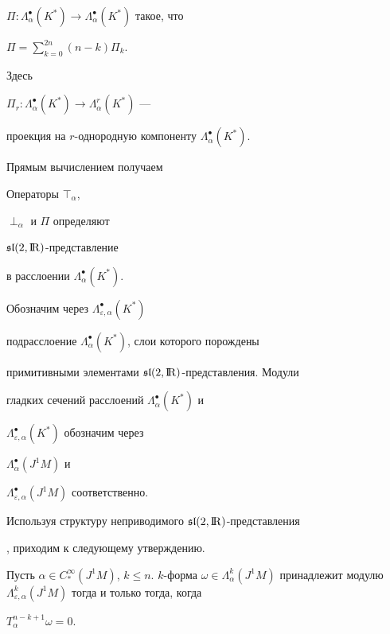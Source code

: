 $\Pi :\Lambda_\alpha^{\bullet }(K^{*})\to \Lambda_\alpha^{\bullet


}(K^{*})$ такое, что 


$\Pi =\sum\limits_{k=0}^{2n}(n-k)\Pi_k$.


Здесь 


$\Pi_r:\Lambda_\alpha^{\bullet }(K^{*})\to \Lambda_\alpha^r(K^{*})$ ---


проекция на $r$-однородную компоненту $\Lambda_\alpha^{\bullet }(K^{*})$.





Прямым вычислением получаем  





\begin{prop}


Операторы $\top_\alpha $,


$\perp_\alpha $ и $\Pi $ определяют


${\frak s\frak l}(2,{\mathrm{I\!R}})$-представление


в расслоении $\Lambda_\alpha^{\bullet }(K^{*})$.


\end{prop}





Обозначим через $\Lambda_{\varepsilon ,\alpha }^{\bullet }(K^{*})$ 


подрасслоение $\Lambda_\alpha^{\bullet }(K^{*})$, слои которого порождены


примитивными элементами ${\frak s\frak l}(2,{\mathrm{I\!R}})$-представления. Модули


гладких сечений расслоений $\Lambda_\alpha^{\bullet }(K^{*})$ и


$\Lambda_{\varepsilon ,\alpha }^{\bullet }(K^{*})$ обозначим через


$\Lambda_{\alpha }^{\bullet }(J^1M)$ и


$\Lambda_{\varepsilon ,\alpha }^{\bullet }(J^1M)$ соответственно. 


Используя структуру неприводимого ${\frak s\frak l}(2,{\mathrm{I\!R}})$-представления 


\cite{serre}, приходим к следующему утверждению.





\begin{prop}


Пусть $\alpha \in C_{*}^\infty (J^1M)$, $k\leq n$.\; $k$-форма $\omega \in


\Lambda_\alpha^k(J^1M)$ принадлежит модулю $\Lambda_{\varepsilon


,\alpha }^k(J^1M)$ тогда и только тогда, когда


$T_\alpha^{n-k+1}\omega =0$.


\end{prop}





